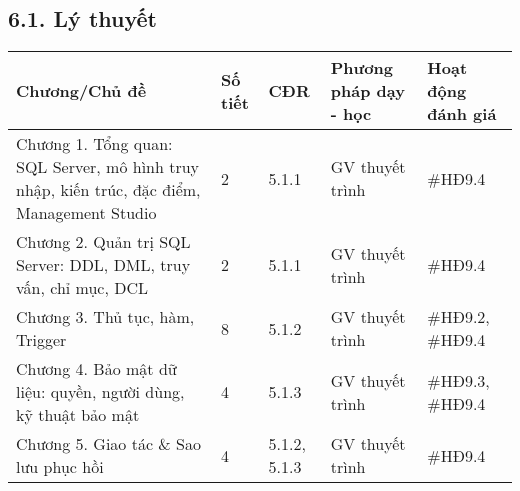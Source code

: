 \documentclass[a4paper,12pt]{article}
\begin{document}
\subsection*{6.1. Lý thuyết}
\begin{longtable}{|p{4cm}|p{2cm}|p{2cm}|p{3cm}|p{3.5cm}|}
\hline
\textbf{Chương/Chủ đề} & \textbf{Số tiết} & \textbf{CĐR} & \textbf{Phương pháp dạy - học} & \textbf{Hoạt động đánh giá} \\
\hline
Chương 1. Tổng quan: SQL Server, mô hình truy nhập, kiến trúc, đặc điểm, Management Studio & 2 & 5.1.1 & GV thuyết trình & \#HĐ9.4 \\
\hline
Chương 2. Quản trị SQL Server: DDL, DML, truy vấn, chỉ mục, DCL & 2 & 5.1.1 & GV thuyết trình & \#HĐ9.4 \\
\hline
Chương 3. Thủ tục, hàm, Trigger & 8 & 5.1.2 & GV thuyết trình & \#HĐ9.2, \#HĐ9.4 \\
\hline
Chương 4. Bảo mật dữ liệu: quyền, người dùng, kỹ thuật bảo mật & 4 & 5.1.3 & GV thuyết trình & \#HĐ9.3, \#HĐ9.4 \\
\hline
Chương 5. Giao tác \& Sao lưu phục hồi & 4 & 5.1.2, 5.1.3 & GV thuyết trình & \#HĐ9.4 \\
\hline
\end{longtable}
\end{document}
